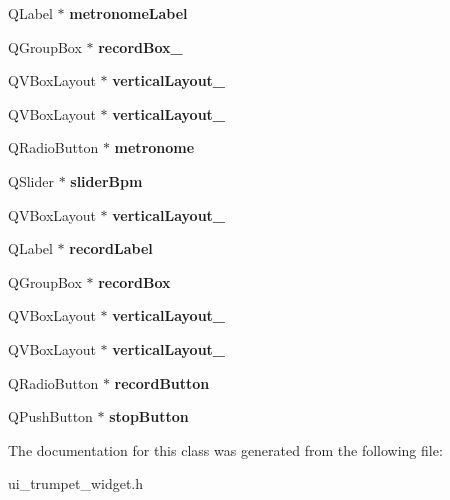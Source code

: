 \begin{DoxyCompactItemize}
Q\+Label $\ast$ {\bfseries metronome\+Label}
\item 
\mbox{\label{classUi__trumpet__widget_a09c113111841701bcf769f5676ace935}} 
Q\+Group\+Box $\ast$ {\bfseries record\+Box\+\_}
\item 
\mbox{\label{classUi__trumpet__widget_a48c3121348eab6d364a49ed8059618b7}} 
Q\+V\+Box\+Layout $\ast$ {\bfseries vertical\+Layout\+\_}
\item 
\mbox{\label{classUi__trumpet__widget_aded204f8822ff9ef87e5a5f0bd62d7ed}} 
Q\+V\+Box\+Layout $\ast$ {\bfseries vertical\+Layout\+\_}
\item 
\mbox{\label{classUi__trumpet__widget_ad296158db62d1d551b74d53d2f5e72f0}} 
Q\+Radio\+Button $\ast$ {\bfseries metronome}
\item 
\mbox{\label{classUi__trumpet__widget_ada18803dde269f8c4aae2d0c71b4d401}} 
Q\+Slider $\ast$ {\bfseries slider\+Bpm}
\item 
\mbox{\label{classUi__trumpet__widget_a03b709628643156cb58af6b7743c6794}} 
Q\+V\+Box\+Layout $\ast$ {\bfseries vertical\+Layout\+\_}
\item 
\mbox{\label{classUi__trumpet__widget_a071f056c80e572639e718cfd945deafc}} 
Q\+Label $\ast$ {\bfseries record\+Label}
\item 
\mbox{\label{classUi__trumpet__widget_a4202af08de118f97ac093d4f2ebc675c}} 
Q\+Group\+Box $\ast$ {\bfseries record\+Box}
\item 
\mbox{\label{classUi__trumpet__widget_aa952e75cc24a438fad0a695ab2376e97}} 
Q\+V\+Box\+Layout $\ast$ {\bfseries vertical\+Layout\+\_}
\item 
\mbox{\label{classUi__trumpet__widget_adce67b65e274d212b82cb2a0a20da505}} 
Q\+V\+Box\+Layout $\ast$ {\bfseries vertical\+Layout\+\_}
\item 
\mbox{\label{classUi__trumpet__widget_a73348741a55b5c64b5101d5b12ccfb68}} 
Q\+Radio\+Button $\ast$ {\bfseries record\+Button}
\item 
\mbox{\label{classUi__trumpet__widget_afebdc2ab52b843bf52f81286e3cb7f0c}} 
Q\+Push\+Button $\ast$ {\bfseries stop\+Button}
\end{DoxyCompactItemize}


The documentation for this class was generated from the following file\+:\begin{DoxyCompactItemize}
\item 
ui\+\_\+trumpet\+\_\+widget.\+h\end{DoxyCompactItemize}
